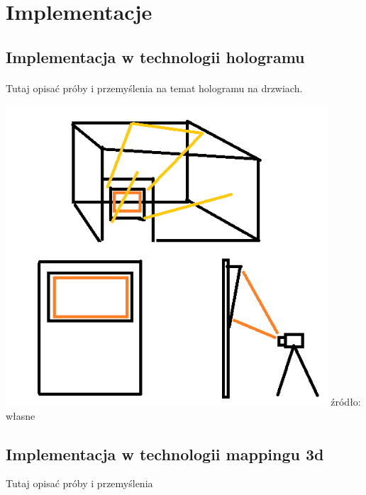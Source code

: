 \section{Implementacje}

\subsection{Implementacja w technologii hologramu}
\paragraph{}
{\color{red}Tutaj opisać próby i przemyślenia na temat hologramu na drzwiach.}
\begin{center}
\includegraphics[width=0.9\textwidth]{images/hologramv1.png}
\small {źródło: własne }
\end{center}

\subsection{Implementacja w technologii mappingu 3d}
{\color{red}Tutaj opisać próby i przemyślenia}